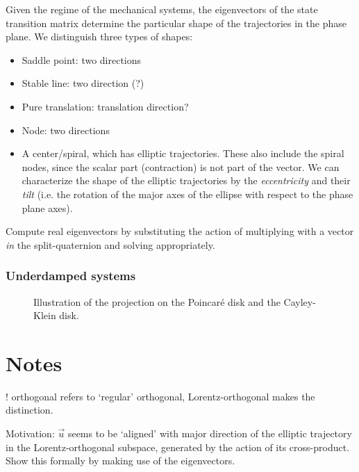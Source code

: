Given the regime of the mechanical systems, the eigenvectors of the state transition matrix determine the particular shape of the trajectories in the phase plane. We distinguish three types of shapes:
\begin{itemize}
    \item[\circled{1}] Saddle point: two directions
    \item[\circled{2}] Stable line: two direction (?)
    \item[\circled{3}] Pure translation: translation direction?
    \item[\circled{4}] Node: two directions
    \item[\circled{6}] A center/spiral, which has elliptic trajectories. These also include the spiral nodes, since the scalar part (contraction) is not part of the vector. We can characterize the shape of the elliptic trajectories by the \emph{eccentricity} and their \emph{tilt} (i.e. the rotation of the major axes of the ellipse with respect to the phase plane axes). 
\end{itemize}

Compute real eigenvectors by substituting the action of multiplying with a vector \emph{in} the split-quaternion and solving appropriately.

\subsubsection{Underdamped systems}

\begin{figure}
    \centering
    
    \caption{Illustration of the projection on the Poincaré disk and the Cayley-Klein disk.}
    \label{fig:hyperboloid_projection}
\end{figure}


\FloatBarrier
\section{Notes}
! orthogonal refers to `regular' orthogonal, Lorentz-orthogonal makes the distinction.

Motivation: $\vec{u}$ seems to be `aligned' with major direction of the elliptic trajectory in the Lorentz-orthogonal subspace, generated by the action of its cross-product. Show this formally by making use of the eigenvectors.

